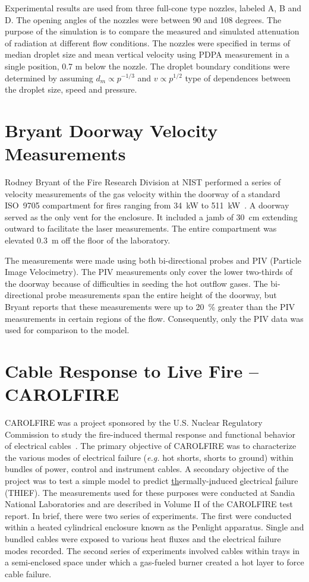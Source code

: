 Experimental results are used from three full-cone type nozzles, labeled A, B and D. The opening angles of the nozzles were between 90 and 108 degrees.
The purpose of the simulation is to compare the measured and simulated attenuation of radiation at different flow conditions. The nozzles were
specified in terms of median droplet size and mean vertical velocity using PDPA measurement in a single position, 0.7 m below the nozzle. The droplet
boundary conditions were determined by assuming $d_m \propto p^{-1/3}$ and $v \propto p^{1/2}$ type of dependences between the droplet size, speed
and pressure.

\section{Bryant Doorway Velocity Measurements}

Rodney Bryant of the Fire Research Division at NIST performed a series of velocity measurements of the gas
velocity within the doorway of a standard ISO~9705 compartment for fires ranging from
34~kW to 511~kW~\cite{Bryant:FSJ2009,Bryant:EF2009,Bryant:CS2010}. A doorway
served as the only vent for the enclosure. It included a jamb of 30~cm extending outward
to facilitate the laser measurements. The entire compartment was elevated 0.3~m off the floor of the laboratory.

The measurements were made using both bi-directional probes and PIV (Particle Image Velocimetry). The PIV measurements only cover the
lower two-thirds of the doorway because of difficulties in seeding the hot outflow gases. The bi-directional probe measurements span the
entire height of the doorway, but Bryant reports that
these measurements were up to 20~\% greater than the PIV measurements in certain regions of
the flow. Consequently, only the PIV data was used for comparison to the
model.


\section{Cable Response to Live Fire -- CAROLFIRE}

CAROLFIRE was a project sponsored by the U.S. Nuclear Regulatory Commission to study the fire-induced thermal
response and functional behavior of electrical cables~\cite{CAROLFIRE}.
The primary objective of CAROLFIRE was to characterize the various modes of electrical
failure ({\em e.g.} hot shorts, shorts to ground) within bundles of power, control and instrument cables.
A secondary objective of the project was to test a simple model to predict \underline{th}ermally-\underline{i}nduced
\underline{e}lectrical \underline{f}ailure (THIEF). The measurements used for these purposes were conducted at Sandia National Laboratories and are described in
Volume II of the CAROLFIRE test report. In brief, there were two series of experiments. The first were conducted within
a heated cylindrical enclosure known as the Penlight apparatus. Single and bundled cables were exposed to various heat fluxes and the
electrical failure modes recorded. The second series of experiments involved cables within trays in a semi-enclosed space under which a gas-fueled burner
created a hot layer to force cable failure.

